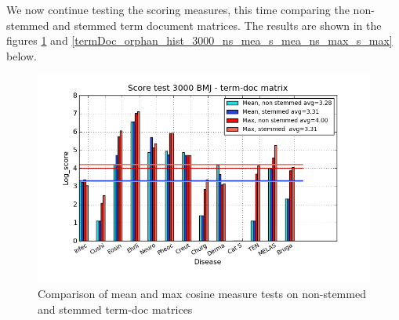 We now continue testing the scoring measures, this time comparing the
non-stemmed and stemmed term document matrices. The results are shown
in the figures \ref{termDoc_bmj_hist_3000_ns_mea_s_mea_ns_max_s_max}
and \ref{termDoc_orphan_hist_3000_ns_mea_s_mea_ns_max_s_max} below.

\begin{figure}[H]
  \caption{Comparison of mean and max cosine measure tests on non-stemmed and stemmed term-doc matrices}
  \begin{center}
    \includegraphics[width=1.2\textwidth]{barcharts/termDoc_bmj_hist_3000_ns_mea_s_mea_ns_max_s_max.png}
  \end{center}
  \label{termDoc_bmj_hist_3000_ns_mea_s_mea_ns_max_s_max}
\end{figure}

